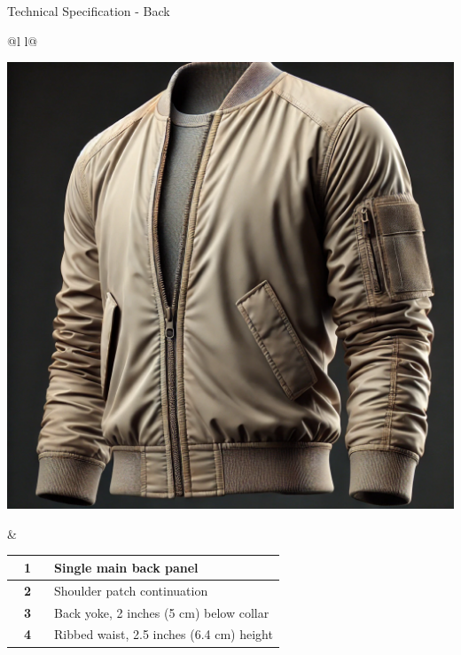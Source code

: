 \documentclass[11pt,a4paper]{article}
\newcommand{\techsection}[1]{
  \vspace{0.8cm}
  \begin{tcolorbox}[
    enhanced,
    colback=accentblue!80,
    colframe=accentblue,
    coltext=white,
    round corners,
    boxrule=0pt,
    width=\textwidth,
    halign=left,
    fontupper=\large\bfseries,
    top=0.4cm,
    bottom=0.4cm,
    left=0.2cm,
    right=0.2cm
  ]
    #1
  \end{tcolorbox}
  \vspace{0.3cm}
}
\begin{document}

\techsection{Technical Specification - Back}

\begin{table}[H]
\centering
\begin{tabular}{@{}l l@{}}
\begin{minipage}[t]{0.5\linewidth}
  \vspace{0pt}
  \includegraphics[width=\linewidth]{DALLE_2025-03-09_22.47.56_-_A_realistic_bomber_jacket_in_a_neutral_color_shown_from_the_side_view._The_jacket_features_a_ribbed_collar_full-length_zipper_in_the_front_and_a_sl.webp}
\end{minipage}
&
\begin{minipage}[t]{0.5\linewidth}
  \vspace{0pt}
  \begin{tabular}{|c|p{0.85\linewidth}|}
    \hline
    \textbf{1} & Single main back panel \\ \hline
    \textbf{2} & Shoulder patch continuation \\ \hline
    \textbf{3} & Back yoke, 2 inches (5 cm) below collar \\ \hline
    \textbf{4} & Ribbed waist, 2.5 inches (6.4 cm) height \\ \hline
  \end{tabular}
\end{minipage}
\end{tabular}
\end{table}
\end{document}
